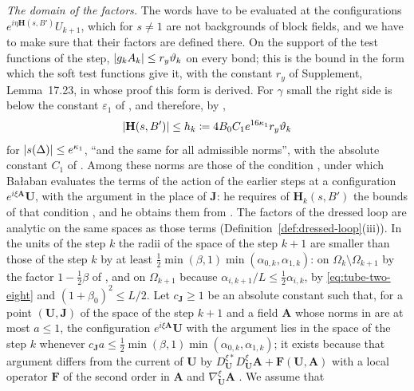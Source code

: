\documentclass[11pt]{preprint}
\DeclarePairedDelimiter{\abs}{\lvert}{\rvert}
\numberwithin{equation}{section}
\theoremstyle{definition}
\theoremstyle{remark}
\theoremstyle{plain}
\begin{document}
\emph{The domain of the factors.} The words have to be evaluated at the configurations $e^{i\eta\mathbf H(s, B')}U_{k+1}$, which for $s \neq 1$ are not backgrounds of block fields, and we have to make sure that their factors are defined there. On the support of the test functions of the step, $\abs{g_kA_k} \leq r_y\vartheta_k$ on every bond; this is the bound \cite[(3.14), p.~267]{BalabanCRE} in the form which the soft test functions give it, with the constant $r_y$ of Supplement, Lemma~17.23, in whose proof this form is derived. For $\gamma$ small the right side is below the constant $\varepsilon_1$ of \cite[p.~7]{BalabanRG2}, and therefore, by \cite[(1.21), p.~7]{BalabanRG2},
\begin{equation}\label{eq:localised-h-size}
    \abs{\mathbf H(s, B')} \leq h_k \coloneqq 4B_0C_1e^{16\kappa_1}r_y\vartheta_k
\end{equation}
for $\abs{s(\Delta)} \leq e^{\kappa_1}$, ``and the same for all admissible norms'', with the absolute constant $C_1$ of \cite[(1.20), p.~6]{BalabanRG2}. Among these norms are those of the condition \cite[(3.14), p.~272]{BalabanRG1}, under which Ba{\l}aban evaluates the terms of the action of the earlier steps at a configuration $e^{i\xi\mathbf A}\mathbf U$, with the argument \cite[(3.13)]{BalabanRG1} in the place of $\mathbf J$: he requires of $\mathbf H_k(s, B')$ the bounds of that condition \cite[p.~7]{BalabanRG2}, and he obtains them from \cite[(1.21)]{BalabanRG2}. The factors of the dressed loop are analytic on the same spaces as those terms (Definition~\ref{def:dressed-loop}(iii)). In the units of the step $k$ the radii of the space of the step $k + 1$ are smaller than those of the step $k$ by at least $\frac12\min(\beta, 1)\min(\alpha_{0,k}, \alpha_{1,k})$: on $\Omega_k \setminus \Omega_{k+1}$ by the factor $1 - \frac12\beta$ of \cite[(2.34)--(2.39), p.~261]{BalabanCRE}, and on $\Omega_{k+1}$ because $\alpha_{i,k+1}/L \leq \frac12\alpha_{i,k}$, by \eqref{eq:tube-two-eight} and $(1 + \beta_0)^2 \leq L/2$. Let $c_{\mathbf J} \geq 1$ be an absolute constant such that, for a point $(\mathbf U, \mathbf J)$ of the space of the step $k + 1$ and a field $\mathbf A$ whose norms in \cite[(3.14)]{BalabanRG1} are at most $a \leq 1$, the configuration $e^{i\xi\mathbf A}\mathbf U$ with the argument \cite[(3.13)]{BalabanRG1} lies in the space of the step $k$ whenever $c_{\mathbf J}a \leq \frac12\min(\beta, 1)\min(\alpha_{0,k}, \alpha_{1,k})$; it exists because that argument differs from the current of $\mathbf U$ by $D^{\xi*}_{\mathbf U}D^\xi_{\mathbf U}\mathbf A + \mathbf F(\mathbf U, \mathbf A)$ with a local operator $\mathbf F$ of the second order in $\mathbf A$ and $\nabla^\xi_{\mathbf U}\mathbf A$ \cite[(3.11), p.~272]{BalabanRG1}. We assume that
\end{document}
